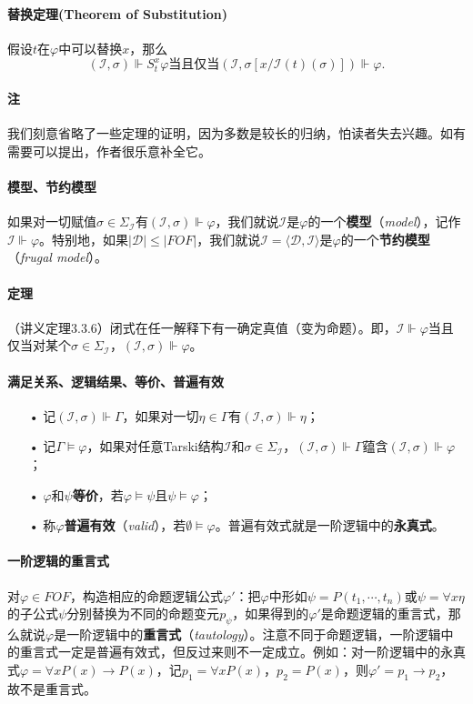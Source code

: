 \documentclass[b5paper,oneside]{ctexbook}
\begin{document}
\paragraph{替换定理(Theorem of Substitution)}假设$t$在$\varphi$中可以替换$x$，那么
\[(\mathscr I,\sigma)\Vdash S_t^x\varphi\text{当且仅当}(\mathscr I,\sigma [x/\mathscr I(t)(\sigma)])\Vdash\varphi.\]
\paragraph{注}我们刻意省略了一些定理的证明，因为多数是较长的归纳，怕读者失去兴趣。如有需要可以提出，作者很乐意补全它。
\paragraph{模型、节约模型}如果对一切赋值$\sigma\in\Sigma_\mathscr I$有$(\mathscr I,\sigma)\Vdash\varphi$，我们就说$\mathscr I$是$\varphi$的一个\textbf{模型}（\textit{model}），记作$\mathscr I\Vdash\varphi$。特别地，如果$|\mathcal{D}|\leq |FOF|$，我们就说$\mathscr I=\langle\mathcal D,\mathcal I\rangle$是$\varphi$的一个\textbf{节约模型}（\textit{frugal model}）。
\paragraph{定理}（讲义定理3.3.6）闭式在任一解释下有一确定真值（变为命题）。即，$\mathscr I\Vdash\varphi$当且仅当对某个$\sigma\in\Sigma_\mathscr I$，$(\mathscr I,\sigma)\Vdash\varphi$。

\paragraph{满足关系、逻辑结果、等价、普遍有效}
\begin{enumerate}
\item[•]记$(\mathscr I,\sigma)\Vdash\Gamma$，如果对一切$\eta\in\Gamma$有$(\mathscr I,\sigma)\Vdash\eta$；
\item[•]记$\Gamma\models\varphi$，如果对任意Tarski结构$\mathscr I$和$\sigma\in\Sigma_\mathscr I$，$(\mathscr I,\sigma)\Vdash\Gamma$蕴含$(\mathscr I,\sigma)\Vdash\varphi$；
\item[•]$\varphi$和$\psi$\textbf{等价}，若$\varphi\models\psi$且$\psi\models\varphi$；
\item[•]称$\varphi$\textbf{普遍有效}（\textit{valid}），若$\emptyset\models\varphi$。普遍有效式就是一阶逻辑中的\textbf{永真式}。
\end{enumerate}

\paragraph{一阶逻辑的重言式}对$\varphi\in FOF$，构造相应的命题逻辑公式$\varphi '$：把$\varphi$中形如$\psi=P(t_1,\cdots ,t_n)$或$\psi =\forall x\eta$的子公式$\psi$分别替换为不同的命题变元$p_\psi$，如果得到的$\varphi'$是命题逻辑的重言式，那么就说$\varphi$是一阶逻辑中的\textbf{重言式}（\textit{tautology}）。注意不同于命题逻辑，一阶逻辑中的重言式一定是普遍有效式，但反过来则不一定成立。例如：对一阶逻辑中的永真式$\varphi=\forall xP(x)\to P(x)$，记$p_1=\forall xP(x)$，$p_2=P(x)$，则$\varphi'=p_1\to p_2$，故不是重言式。
\end{document}
